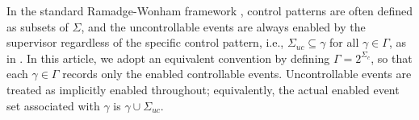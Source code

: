 \documentclass[journal,twoside,web]{ieeecolor}
\begin{document}
%

\begin{remark}\label{rem:uc_ctrl_pattern}
    
    In the standard Ramadge-Wonham framework \cite{ramadge1987supervisory}, control patterns are often defined as subsets of $\Sigma$, and the uncontrollable events are always enabled by the supervisor regardless of the specific control pattern, i.e., $\Sigma_{uc}\subseteq \gamma$ for all $\gamma\in\Gamma$, as in \cite{yin2016synthesis,yin2018synthesis}.
    In this article, we adopt an equivalent convention by defining $\Gamma=2^{\Sigma_c}$, so that each $\gamma\in\Gamma$ records only the enabled controllable events.
    Uncontrollable events are treated as implicitly enabled throughout; equivalently, the actual enabled event set associated with $\gamma$ is $\gamma\cup\Sigma_{uc}$.
\end{remark}
\end{document}
